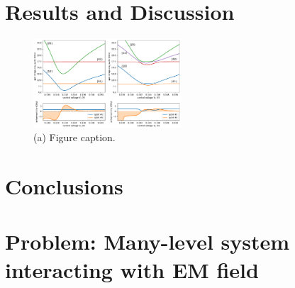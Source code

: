 \documentclass[twocolumn,superscriptaddress,unsortedaddress,
 amsmath,amssymb,
 aps,
]{revtex4-2}
\begin{document}
\section{Results and Discussion} %

\begin{figure}
\includegraphics[width=0.49\textwidth]{figure3.pdf}
\caption{\label{fig3} (a) Figure caption.}
\end{figure}


\section{Conclusions} %

\section{\label{sec:level1}Problem: Many-level system interacting with EM field}
\end{document}
